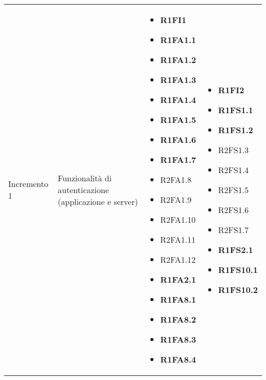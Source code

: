 {\begin{longtable}{C{3cm} C{4cm} C{4cm} C{4cm}}
Incremento 1 & Funzionalità di autenticazione (applicazione e server) & \begin{itemize}
    \item[ ] \textbf{R1FI1}
    \item[ ] \textbf{R1FA1.1}
    \item[ ] \textbf{R1FA1.2}
    \item[ ] \textbf{R1FA1.3}
    \item[ ] \textbf{R1FA1.4}
    \item[ ] \textbf{R1FA1.5}
    \item[ ] \textbf{R1FA1.6}
    \item[ ] \textbf{R1FA1.7}
    \item[ ] R2FA1.8
    \item[ ] R2FA1.9
    \item[ ] R2FA1.10
    \item[ ] R2FA1.11
    \item[ ] R2FA1.12 
    \item[ ] \textbf{R1FA2.1}
    \item[ ] \textbf{R1FA8.1}
    \item[ ] \textbf{R1FA8.2}
    \item[ ] \textbf{R1FA8.3}
    \item[ ] \textbf{R1FA8.4}
\end{itemize} & \begin{itemize} 
    \item[ ] \textbf{R1FI2}
    \item[ ] \textbf{R1FS1.1}
    \item[ ] \textbf{R1FS1.2}
    \item[ ] R2FS1.3
    \item[ ] R2FS1.4
    \item[ ] R2FS1.5
    \item[ ] R2FS1.6
    \item[ ] R2FS1.7
    \item[ ] \textbf{R1FS2.1}
    \item[ ] \textbf{R1FS10.1}
    \item[ ] \textbf{R1FS10.2}
\end{itemize}\\


\end{longtable}}
